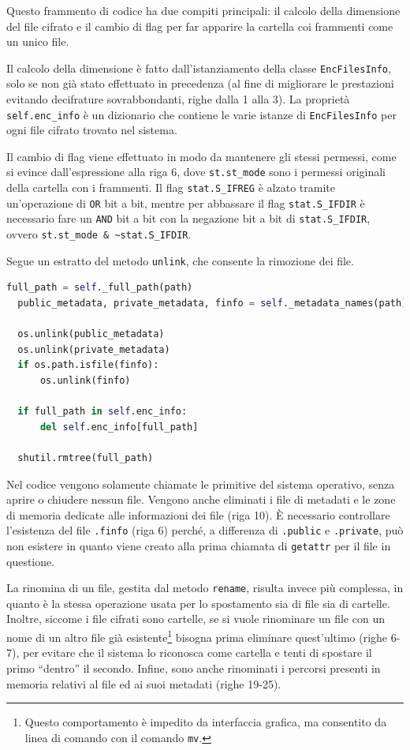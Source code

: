 \documentclass[a4paper,12pt,twoside,openright]{report}
\begin{document}
  Questo frammento di codice ha due compiti principali: il calcolo della dimensione del file cifrato e il cambio di
  flag per far apparire la cartella coi frammenti come un unico file.
  
  Il calcolo della dimensione è fatto dall'istanziamento della classe
  \texttt{EncFilesInfo}, solo se non già stato effettuato in precedenza (al fine di migliorare le prestazioni
  evitando decifrature sovrabbondanti, righe dalla 1 alla 3).
  La proprietà \texttt{self.enc\_info} è un dizionario che contiene le varie istanze di \texttt{EncFilesInfo}
  per ogni file cifrato trovato nel sistema.

  Il cambio di flag viene effettuato in modo da mantenere gli stessi permessi, come si evince dall'espressione
  alla riga 6, dove \texttt{st.st\_mode} sono i permessi originali della cartella con i frammenti.
  Il flag \texttt{stat.S\_IFREG} è alzato tramite un'operazione di \texttt{OR} bit a bit, mentre per abbassare il
  flag \texttt{stat.S\_IFDIR} è necessario fare un \texttt{AND} bit a bit
  con la negazione bit a bit di \texttt{stat.S\_IFDIR}, ovvero \texttt{st.st\_mode \& \textasciitilde stat.S\_IFDIR}.

  Segue un estratto del metodo \texttt{unlink}, che consente la rimozione dei file.
  \begin{lstlisting}[language=Python]
  full_path = self._full_path(path)
  public_metadata, private_metadata, finfo = self._metadata_names(path)

  os.unlink(public_metadata)
  os.unlink(private_metadata)
  if os.path.isfile(finfo):
      os.unlink(finfo)

  if full_path in self.enc_info:
      del self.enc_info[full_path]

  shutil.rmtree(full_path)
  \end{lstlisting}

  Nel codice vengono solamente chiamate le primitive del sistema operativo, senza aprire o chiudere
  nessun file. Vengono anche eliminati i file di metadati e le zone di memoria dedicate
  alle informazioni dei file (riga 10).
  È necessario controllare l'esistenza del file \texttt{.finfo} (riga 6) perché,
  a differenza di \texttt{.public} e \texttt{.private}, può non esistere
  in quanto viene creato alla prima chiamata di \texttt{getattr} per il file in questione.

  La rinomina di un file, gestita dal metodo \texttt{rename}, risulta invece più complessa, in quanto
  è la stessa operazione usata per lo spostamento sia di file sia di cartelle.
  Inoltre, siccome i file cifrati sono cartelle, se si vuole rinominare un file con un nome di un altro file già
  esistente\footnote{Questo comportamento è impedito da interfaccia grafica, ma consentito da linea di comando con il comando \texttt{mv}.}
  bisogna prima eliminare quest'ultimo (righe 6-7), per evitare che il sistema lo riconosca come cartella e
  tenti di spostare il primo ``dentro'' il secondo.
  Infine, sono anche rinominati i percorsi presenti in memoria relativi al file ed ai suoi metadati (righe 19-25).
\end{document}
